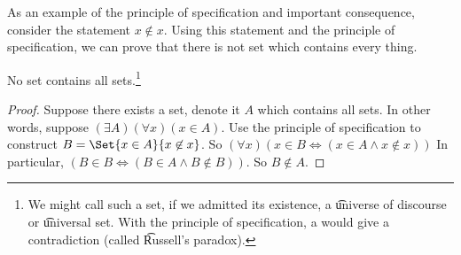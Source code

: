 




As an example of the principle of specification and important consequence, consider the statement $x \not\in x$.
Using this statement and the principle of specification, we can prove that there is not set which contains every thing.

\begin{proposition}
  No set contains all sets.\footnote{We might call such a set, if we admitted its existence, a \t{universe of discourse} or \t{universal set}.
  With the principle of specification, a  would give a contradiction (called \t{Russell's paradox}).}
\begin{proof}
  Suppose there exists a set, denote it $A$ which contains all sets.
  In other words, suppose $(\exists A)(\forall x)(x \in A)$.
  Use the principle of specification to construct $B = \Set{x \in A}{x \not\in x}$.
  So $(\forall x)(x \in B \iff (x \in A \land x \not\in x))$
  In particular, $(B \in B \iff (B \in A \land B \not\in B))$.
  So $B \not \in A$.
\end{proof}
\end{proposition}



%
%


